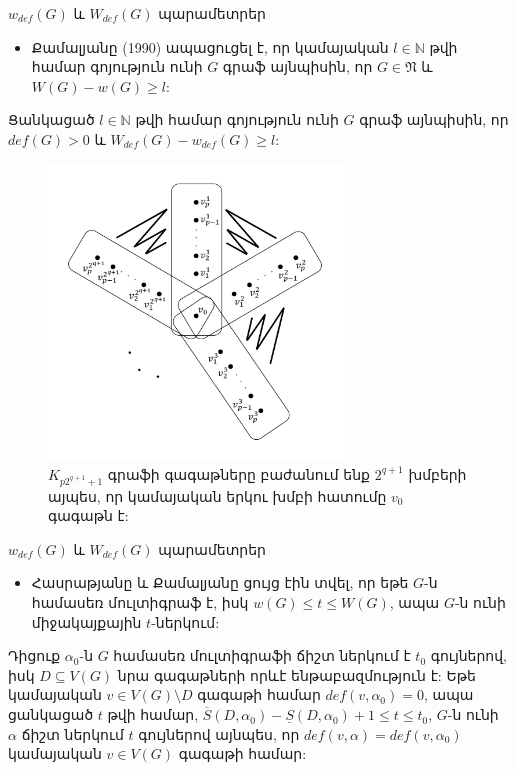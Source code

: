 \begin{frame}{$w_{def}(G)$ և $W_{def}(G)$ պարամետրեր}

\begin{itemize}
    \item Քամալյանը (1990) ապացուցել է, որ կամայական $l\in \mathbb{N}$ թվի համար գոյություն ունի $G$ գրաֆ այնպիսին, որ $G\in \mathfrak{N}$ և $W(G)-w(G)\geq l$:
\end{itemize}

\begin{theorem}[3.1.10]
Ցանկացած $l\in \mathbb{N}$ թվի համար գոյություն ունի $G$ գրաֆ այնպիսին, որ $def(G)>0$ և $W_{def}(G)-w_{def}(G)\geq l$:
\end{theorem}
\begin{hide}

\begin{figure}[t!]
\centering
\includegraphics[width=0.7\textwidth]{figures/complete-graph-edges.pdf}
\caption{$K_{p2^{q+1}+1}$ գրաֆի գագաթները բաժանում ենք $2^{q+1}$ խմբերի այպես, որ կամայական երկու խմբի հատումը $v_0$ գագաթն է:}
\label{complete-graph}
\end{figure}
\end{hide}
\end{frame}

\begin{frame}{$w_{def}(G)$ և $W_{def}(G)$ պարամետրեր}
\begin{itemize}
    \item Հասրաթյանը և Քամալյանը ցույց էին տվել, որ եթե $G$-ն համասեռ մուլտիգրաֆ է, իսկ $w(G) \leq t \leq W(G)$, ապա $G$-ն ունի միջակայքային $t$-ներկում:
\end{itemize}

\begin{theorem}[3.1.11]
Դիցուք $\alpha_0$-ն $G$ համասեռ մուլտիգրաֆի ճիշտ ներկում է $t_0$ գույներով, իսկ $D \subseteq V(G)$ նրա գագաթների որևէ ենթաբազմություն է: Եթե կամայական $v \in V(G) \setminus D$ գագաթի համար $def(v,\alpha_0)=0$, ապա ցանկացած $t$ թվի համար, $\overline{S}(D,\alpha_0) - \underline{S}(D,\alpha_0) + 1 \leq t \leq t_0$, $G$-ն ունի $\alpha$ ճիշտ ներկում $t$ գույներով այնպես, որ $def(v,\alpha) = def(v,\alpha_0)$ կամայական $v\in V(G)$ գագաթի համար:
\end{theorem}
\end{frame}


